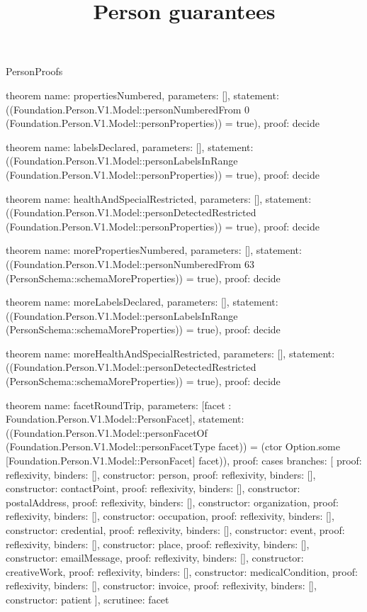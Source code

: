 \begin{lexlean}{PersonProofs}
\title{Person guarantees}
\begin{semanticmodule}
theorem{
  name: propertiesNumbered,
  parameters: [],
  statement: ((Foundation.Person.V1.Model::personNumberedFrom 0 (Foundation.Person.V1.Model::personProperties)) = true),
  proof: decide{}
}

theorem{
  name: labelsDeclared,
  parameters: [],
  statement: ((Foundation.Person.V1.Model::personLabelsInRange (Foundation.Person.V1.Model::personProperties)) = true),
  proof: decide{}
}

theorem{
  name: healthAndSpecialRestricted,
  parameters: [],
  statement: ((Foundation.Person.V1.Model::personDetectedRestricted (Foundation.Person.V1.Model::personProperties)) = true),
  proof: decide{}
}

theorem{
  name: morePropertiesNumbered,
  parameters: [],
  statement: ((Foundation.Person.V1.Model::personNumberedFrom 63 (PersonSchema::schemaMoreProperties)) = true),
  proof: decide{}
}

theorem{
  name: moreLabelsDeclared,
  parameters: [],
  statement: ((Foundation.Person.V1.Model::personLabelsInRange (PersonSchema::schemaMoreProperties)) = true),
  proof: decide{}
}

theorem{
  name: moreHealthAndSpecialRestricted,
  parameters: [],
  statement: ((Foundation.Person.V1.Model::personDetectedRestricted (PersonSchema::schemaMoreProperties)) = true),
  proof: decide{}
}

theorem{
  name: facetRoundTrip,
  parameters: [facet : Foundation.Person.V1.Model::PersonFacet],
  statement: ((Foundation.Person.V1.Model::personFacetOf (Foundation.Person.V1.Model::personFacetType facet)) = (ctor Option.some [Foundation.Person.V1.Model::PersonFacet] facet)),
  proof: cases{
    branches: [
      {proof: reflexivity{}, binders: [], constructor: person},
      {proof: reflexivity{}, binders: [], constructor: contactPoint},
      {proof: reflexivity{}, binders: [], constructor: postalAddress},
      {proof: reflexivity{}, binders: [], constructor: organization},
      {proof: reflexivity{}, binders: [], constructor: occupation},
      {proof: reflexivity{}, binders: [], constructor: credential},
      {proof: reflexivity{}, binders: [], constructor: event},
      {proof: reflexivity{}, binders: [], constructor: place},
      {proof: reflexivity{}, binders: [], constructor: emailMessage},
      {proof: reflexivity{}, binders: [], constructor: creativeWork},
      {proof: reflexivity{}, binders: [], constructor: medicalCondition},
      {proof: reflexivity{}, binders: [], constructor: invoice},
      {proof: reflexivity{}, binders: [], constructor: patient}
    ],
    scrutinee: facet
  }
}


\end{semanticmodule}
\end{lexlean}

